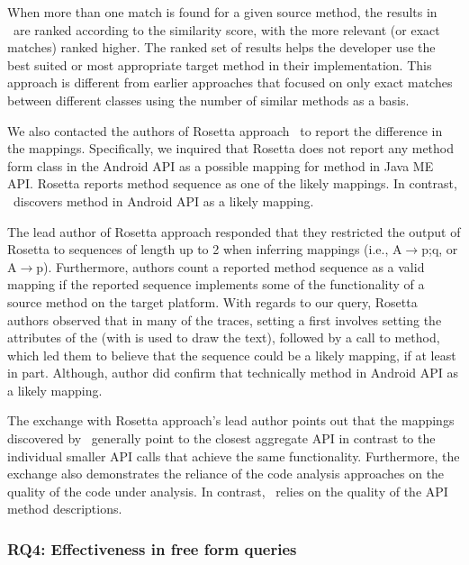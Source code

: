 When more than one match is found for a given source method, the results in \tool\ are ranked according to the similarity score, with the more relevant (or exact matches) ranked higher. 
The ranked set of results helps the developer use the best suited or most appropriate target method in their implementation. This approach is different from earlier approaches \cite{Gokhale2013ICSE,nguyen2014statistical} that focused on only exact matches between different classes using the number of similar methods as a basis. 


We also contacted the authors of Rosetta approach~\cite{Gokhale2013ICSE} to report the difference in the mappings.
Specifically, we inquired that Rosetta does not report any method form  class in the Android API as a possible mapping for
 method in Java ME API.
Rosetta reports method sequence    as one of the likely mappings.
In contrast, \tool\ discovers  method in Android API as a likely mapping.

The lead author of Rosetta approach responded that they restricted the output of
Rosetta to sequences of length up to 2 when inferring mappings (i.e., {A$\rightarrow$p;q}, or {A$\rightarrow$p}). Furthermore, authors count a reported method sequence as a valid mapping
if the reported sequence implements some of the functionality of a source method on the target platform.
With regards to our query, Rosetta authors observed that in many of the traces, setting a  first involves setting the attributes of the  (with is used to draw the text), followed by a call to  method, which led them to believe that the sequence    could be a likely mapping, if at least in part.
Although, author did confirm that technically  method in Android API as a likely mapping.

The exchange with Rosetta approach's lead author points out that
the mappings discovered by \tool\ generally point to
the closest aggregate API in contrast to the individual smaller API calls
that achieve the same functionality.
Furthermore, the exchange also demonstrates the reliance of the
code analysis approaches on the quality of the code under analysis.
In contrast, \tool\ relies on the quality of the API method descriptions.


\subsubsection{RQ4: Effectiveness in free form queries}

